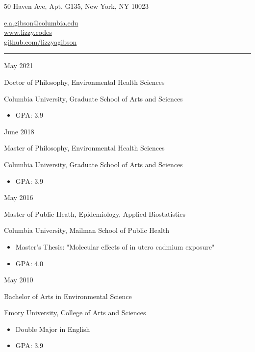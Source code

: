 \documentclass[a4paper,10pt]{article}
\newlength{\cvcolumngapwidth}
\newlength{\cvleftcolumnwidth}
\newlength{\cvrightcolumnwidth}
\newcommand{\cvsectionstyle}[1]{{\normalsize\cvsectionfont\textcolor{cvsectioncolor}{#1}}}
\newcommand{\cvtitlestyle}[1]{{\large\cvtitlefont\textcolor{cvtitlecolor}{#1}}}
\newcommand{\cvdurationstyle}[1]{{\small\cvdurationfont\textcolor{cvdurationcolor}{#1}}}
\newlength{\cvafteritemskipamount}
\newlength{\cvaftersectionskipamount}
\newlength{\cvaftertitleskipamount}
\newlength{\cvparskip}
\newcommand{\cvpersonalinfo}[2]{
    \begin{minipage}[t]{\cvleftcolumnwidth}
        \vspace{0mm} %
        \raggedleft #1
    \end{minipage}%
    \hspace{\cvcolumngapwidth}%
    \begin{minipage}[t]{\cvrightcolumnwidth}
        \vspace{0mm} %
        #2
    \end{minipage}

    \vspace{\cvafteritemskipamount}
}
\newcommand{\cvsection}[1]{
    \begin{minipage}[t]{\cvleftcolumnwidth}
        \raggedleft\cvsectionstyle{#1}
    \end{minipage}%
    \hspace{\cvcolumngapwidth}%
    \begin{minipage}[t]{\cvrightcolumnwidth}
        \textcolor{cvrulecolor}{\rule{\cvrightcolumnwidth}{0.3mm}}
    \end{minipage}

    \vspace{\cvaftersectionskipamount}
}
\newcommand{\cvitem}[2]{
    \begin{minipage}[t]{\cvleftcolumnwidth}
        \raggedleft #1
    \end{minipage}%
    \hspace{\cvcolumngapwidth}%
    \begin{minipage}[t]{\cvrightcolumnwidth}
        \setlength{\parskip}{\cvparskip} #2
    \end{minipage}

    \vspace{\cvafteritemskipamount}
}
\newcommand{\cvtitle}[1]{
    \cvtitlestyle{#1}

    \vspace{\cvaftertitleskipamount}
    \vspace{-\cvparskip}
}
\begin{document}

\cvpersonalinfo{
    \huge\cvnamefont{Elizabeth A. Gibson}

}{
    {
        50 Haven Ave, Apt. G135, New York, NY 10023
    }

    {
       \href{mailto:e.a.gibson@columbia.edu}{e.a.gibson@columbia.edu} \\
       \href{https://lizzy.codes}{www.lizzy.codes} \\
       \href{https://github.com/lizzyagibson}{github.com/lizzyagibson}
        }
    
}


\cvsection{EDUCATION}

\cvitem{
    \cvdurationstyle{May 2021}
}{
    \cvtitle{Doctor of Philosophy, Environmental Health Sciences}

    Columbia University, Graduate School of Arts and Sciences
    \begin{itemize}[leftmargin=*]
	\item GPA: 3.9
    \end{itemize}
}

\cvitem{
    \cvdurationstyle{June 2018}
}{
    \cvtitle{Master of Philosophy, Environmental Health Sciences}
    Columbia University, Graduate School of Arts and Sciences
    \begin{itemize}[leftmargin=*]
	\item GPA: 3.9
    \end{itemize}
}

\cvitem{
    \cvdurationstyle{May 2016}
}{
    \cvtitle{Master of Public Heath, Epidemiology, Applied Biostatistics}

    Columbia University, Mailman School of Public Health

    \begin{itemize}[leftmargin=*]
        \item Master's Thesis: "Molecular effects of in utero cadmium exposure"
        \item GPA: 4.0
    \end{itemize}
}

\cvitem{
    \cvdurationstyle{May 2010}
}{
    \cvtitle{Bachelor of Arts in Environmental Science}

    Emory University, College of Arts and Sciences

    \begin{itemize}[leftmargin=*]
    	\item Double Major in English
	\item GPA: 3.9
    \end{itemize}
}
\end{document}
